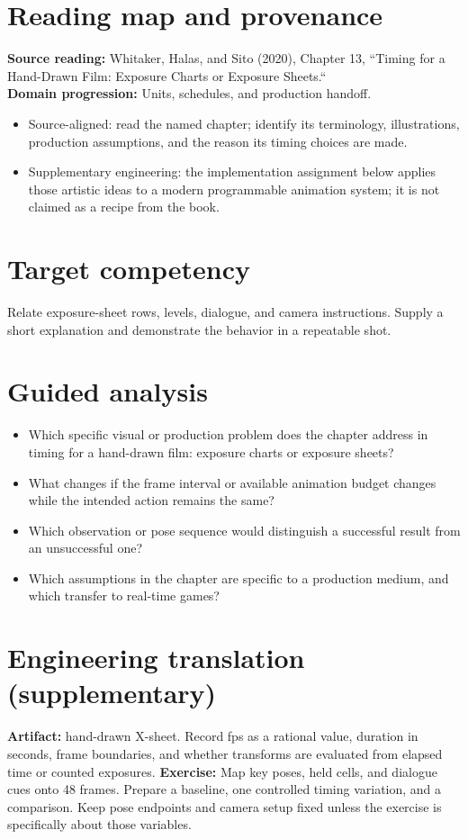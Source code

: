 \documentclass[10pt,letterpaper]{article}
\begin{document}
\makedoctitle
\makedocsummary

\section{Reading map and provenance}
\textbf{Source reading:} Whitaker, Halas, and Sito (2020), Chapter 13, ``Timing for a Hand-Drawn Film: Exposure Charts or Exposure Sheets.``\\
\textbf{Domain progression:} Units, schedules, and production handoff.
\begin{itemize}
\item Source-aligned: read the named chapter; identify its terminology, illustrations, production assumptions, and the reason its timing choices are made.
\item Supplementary engineering: the implementation assignment below applies those artistic ideas to a modern programmable animation system; it is not claimed as a recipe from the book.
\end{itemize}
\section{Target competency}
Relate exposure-sheet rows, levels, dialogue, and camera instructions. Supply a short explanation and demonstrate the behavior in a repeatable shot.
\section{Guided analysis}
\begin{itemize}
\item Which specific visual or production problem does the chapter address in timing for a hand-drawn film: exposure charts or exposure sheets?
\item What changes if the frame interval or available animation budget changes while the intended action remains the same?
\item Which observation or pose sequence would distinguish a successful result from an unsuccessful one?
\item Which assumptions in the chapter are specific to a production medium, and which transfer to real-time games?
\end{itemize}
\section{Engineering translation (supplementary)}
\textbf{Artifact:} hand-drawn X-sheet. Record fps as a rational value, duration in seconds, frame boundaries, and whether transforms are evaluated from elapsed time or counted exposures.
\textbf{Exercise:} Map key poses, held cells, and dialogue cues onto 48 frames. Prepare a baseline, one controlled timing variation, and a comparison. Keep pose endpoints and camera setup fixed unless the exercise is specifically about those variables.
\end{document}
